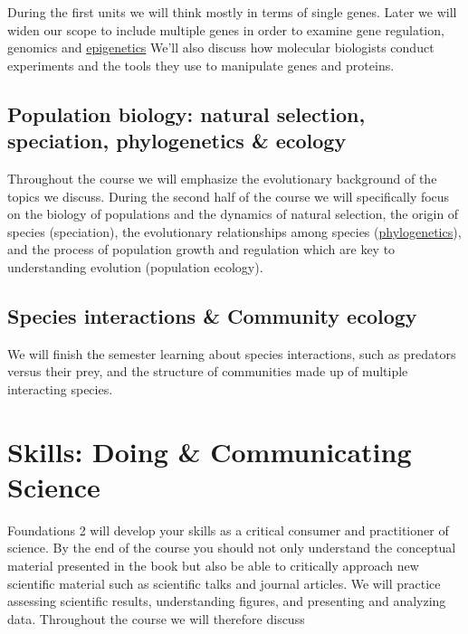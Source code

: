 \documentclass[
]{book}
\begin{document}
During the first units we will think mostly in terms of single genes. Later we will widen our scope to include multiple genes in order to examine gene regulation, genomics and \href{https://en.wikipedia.org/wiki/Epigenetics}{epigenetics} We'll also discuss how molecular biologists conduct experiments and the tools they use to manipulate genes and proteins.

\hypertarget{population-biology-natural-selection-speciation-phylogenetics-ecology}{%
\subsection{Population biology: natural selection, speciation, phylogenetics \& ecology}\label{population-biology-natural-selection-speciation-phylogenetics-ecology}}

Throughout the course we will emphasize the evolutionary background of the topics we discuss. During the second half of the course we will specifically focus on the biology of populations and the dynamics of natural selection, the origin of species (speciation), the evolutionary relationships among species (\href{https://en.wikipedia.org/wiki/Phylogenetics}{phylogenetics}), and the process of population growth and regulation which are key to understanding evolution (population ecology).

\hypertarget{species-interactions-community-ecology}{%
\subsection{Species interactions \& Community ecology}\label{species-interactions-community-ecology}}

We will finish the semester learning about species interactions, such as predators versus their prey, and the structure of communities made up of multiple interacting species.

\hypertarget{skills-doing-communicating-science}{%
\section{Skills: Doing \& Communicating Science}\label{skills-doing-communicating-science}}

Foundations 2 will develop your skills as a critical consumer and practitioner of science. By the end of the course you should not only understand the conceptual material presented in the book but also be able to critically approach new scientific material such as scientific talks and journal articles. We will practice assessing scientific results, understanding figures, and presenting and analyzing data. Throughout the course we will therefore discuss
\end{document}

